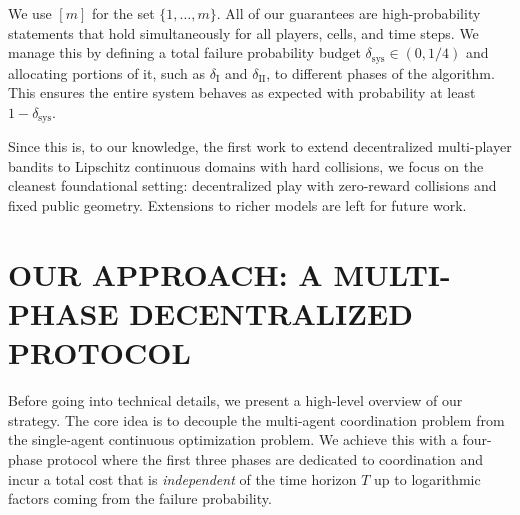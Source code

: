 We use $[m]$ for the set $\{1,\dots,m\}$. All of our guarantees are high-probability statements that hold simultaneously for all players, cells, and time steps. We manage this by defining a total failure probability budget $\delta_{\textrm{sys}}\in(0,1/4)$ and allocating portions of it, such as $\delta_{\text{I}}$ and $\delta_{\text{II}}$, to different phases of the algorithm. This ensures the entire system behaves as expected with probability at least $1-\delta_{\textrm{sys}}$.

Since this is, to our knowledge, the first work to extend decentralized multi-player bandits to Lipschitz continuous domains with hard collisions, we focus on the cleanest foundational setting: decentralized play with zero-reward collisions and fixed public geometry. Extensions to richer models are left for future work.

\section{OUR APPROACH: A MULTI-PHASE DECENTRALIZED PROTOCOL}

Before going into technical details, we present a high-level overview of our strategy. The core idea is to decouple the multi-agent coordination problem from the single-agent continuous optimization problem. We achieve this with a four-phase protocol where the first three phases are dedicated to coordination and incur a total cost that is \emph{independent} of the time horizon $T$ up to logarithmic factors coming from the failure probability.

